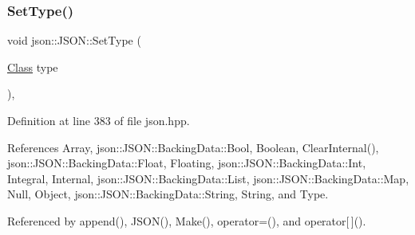 \subsubsection{\texorpdfstring{Set\+Type()}{SetType()}}
{\footnotesize\ttfamily void json\+::\+J\+S\+O\+N\+::\+Set\+Type (\begin{DoxyParamCaption}\item[{\mbox{\hyperlink{classjson_1_1_j_s_o_n_a762f55df6d407c1af61607ed516ffe07}{Class}}}]{type }\end{DoxyParamCaption})\hspace{0.3cm}{\ttfamily [inline]}, {\ttfamily [private]}}



Definition at line 383 of file json.\+hpp.



References Array, json\+::\+J\+S\+O\+N\+::\+Backing\+Data\+::\+Bool, Boolean, Clear\+Internal(), json\+::\+J\+S\+O\+N\+::\+Backing\+Data\+::\+Float, Floating, json\+::\+J\+S\+O\+N\+::\+Backing\+Data\+::\+Int, Integral, Internal, json\+::\+J\+S\+O\+N\+::\+Backing\+Data\+::\+List, json\+::\+J\+S\+O\+N\+::\+Backing\+Data\+::\+Map, Null, Object, json\+::\+J\+S\+O\+N\+::\+Backing\+Data\+::\+String, String, and Type.



Referenced by append(), J\+S\+O\+N(), Make(), operator=(), and operator\mbox{[}$\,$\mbox{]}().


